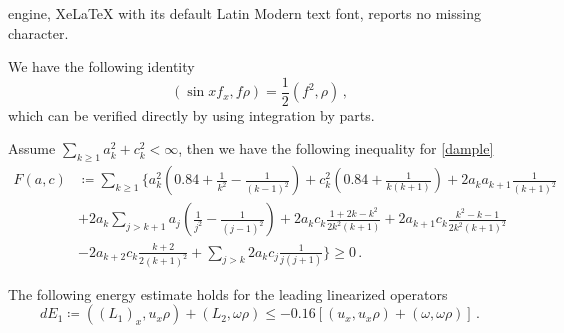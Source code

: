 \documentclass[10pt,a4paper]{amsart}
\begin{document}
engine, XeLaTeX with its default Latin Modern text font, reports no missing character.
\begin{lemma}
\label{dampl}We have the following identity
$$(\sin x f_x,f\rho)=\frac{1}{2}(f^2,\rho)\,,$$
which can be verified directly by using integration by parts.
\end{lemma}

\begin{lemma}
\label{cap}
    Assume $\sum_{k\geq 1} a_k^2+c_k^2<\infty$, then we have the following inequality for \eqref{dample}
    $$\begin{aligned}
 F(a,c)&\coloneqq \sum_{k\geq1}\{ a_k^2(0.84+\frac{1}{k^2}-\frac{1}{(k-1)^2})+c_k^2(0.84+\frac{1}{k(k+1)})+ 2a_k a_{k+1}\frac{1}{(k+1)^2}\\&+2 a_k \sum_{j>k+1}a_j(\frac{1}{j^2}-\frac{1}{(j-1)^2})+2a_kc_k\frac{1+2k-k^2}{2k^2(k+1)}+2a_{k+1}c_k\frac{k^2-k-1}{2k^2(k+1)^2}\\&-2a_{k+2}c_k\frac{k+2}{2(k+1)^2}+\sum_{j>k}2a_k c_j\frac{1}{j(j+1)}\}\geq0\,.\end{aligned}$$
\end{lemma}

\begin{proposition}\label{prop d} The following energy estimate holds for the leading linearized operators
$$dE_1\coloneqq((L_1)_x,u_x\rho)+(L_2,\omega\rho)\leq -0.16[(u_x,u_x\rho)+(\omega,\omega\rho)]\,.$$
\end{proposition}
\end{document}
